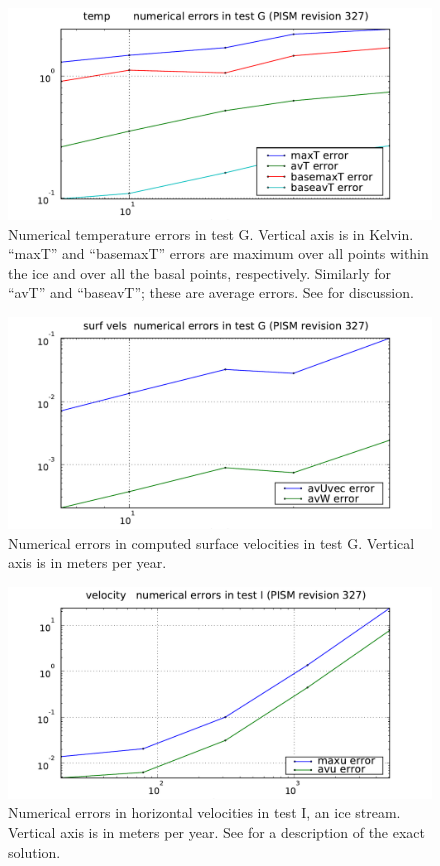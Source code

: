 \documentclass[11pt,final]{amsart}
\begin{document}
\begin{figure}[ht]
\includegraphics[width=4.8in,keepaspectratio=true]{figs/temperrs_G}
\caption{Numerical temperature errors in test G.  Vertical axis is in Kelvin.  ``maxT'' and ``basemaxT'' errors are maximum over all points within the ice and over all the basal points, respectively.  Similarly for ``avT'' and ``baseavT''; these are average errors.  See \cite{BBL} for discussion.}
\label{fig:temperrsG}
\end{figure}

\begin{figure}[ht]
\includegraphics[width=4.8in,keepaspectratio=true]{figs/surfvelerrs_G}
\caption{Numerical errors in computed surface velocities in test G.  Vertical axis is in meters per year.}
\label{fig:surfvelerrsG}
\end{figure}

\begin{figure}[ht]
\includegraphics[width=4.8in,keepaspectratio=true]{figs/velerrs_I}
\caption{Numerical errors in horizontal velocities in test I, an ice stream.  Vertical axis is in meters per year.  See \cite{SchoofStream} for a description of the exact solution.}
\label{fig:velerrsI}
\end{figure}
\end{document}
